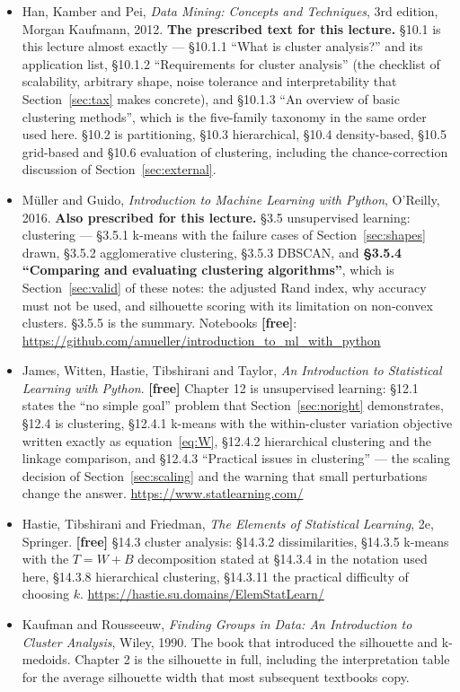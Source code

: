 \documentclass[11pt]{article}
\begin{document}
\begin{itemize}[leftmargin=*]
  \item Han, Kamber and Pei, \emph{Data Mining: Concepts and Techniques}, 3rd
    edition, Morgan Kaufmann, 2012. \textbf{The prescribed text for this
    lecture.} \S10.1 is this lecture almost exactly --- \S10.1.1 ``What is
    cluster analysis?'' and its application list, \S10.1.2 ``Requirements for
    cluster analysis'' (the checklist of scalability, arbitrary shape, noise
    tolerance and interpretability that Section~\ref{sec:tax} makes concrete),
    and \S10.1.3 ``An overview of basic clustering methods'', which is the
    five-family taxonomy in the same order used here. \S10.2 is partitioning,
    \S10.3 hierarchical, \S10.4 density-based, \S10.5 grid-based and \S10.6
    evaluation of clustering, including the chance-correction discussion of
    Section~\ref{sec:external}.
  \item M\"uller and Guido, \emph{Introduction to Machine Learning with
    Python}, O'Reilly, 2016. \textbf{Also prescribed for this lecture.}
    \S3.5 unsupervised learning: clustering --- \S3.5.1 k-means with the
    failure cases of Section~\ref{sec:shapes} drawn, \S3.5.2 agglomerative
    clustering, \S3.5.3 DBSCAN, and \textbf{\S3.5.4 ``Comparing and
    evaluating clustering algorithms''}, which is Section~\ref{sec:valid} of
    these notes: the adjusted Rand index, why accuracy must not be used, and
    silhouette scoring with its limitation on non-convex clusters. \S3.5.5
    is the summary. Notebooks \textbf{[free]}:
    \url{https://github.com/amueller/introduction_to_ml_with_python}
  \item James, Witten, Hastie, Tibshirani and Taylor, \emph{An Introduction to
    Statistical Learning with Python}. \textbf{[free]} Chapter 12 is
    unsupervised learning: \S12.1 states the ``no simple goal'' problem that
    Section~\ref{sec:noright} demonstrates, \S12.4 is clustering, \S12.4.1
    k-means with the within-cluster variation objective written exactly as
    equation~\eqref{eq:W}, \S12.4.2 hierarchical clustering and the linkage
    comparison, and \S12.4.3 ``Practical issues in clustering'' --- the
    scaling decision of Section~\ref{sec:scaling} and the warning that small
    perturbations change the answer. \url{https://www.statlearning.com/}
  \item Hastie, Tibshirani and Friedman, \emph{The Elements of Statistical
    Learning}, 2e, Springer. \textbf{[free]} \S14.3 cluster analysis: \S14.3.2
    dissimilarities, \S14.3.5 k-means with the $T = W + B$ decomposition
    stated at \S14.3.4 in the notation used here, \S14.3.8 hierarchical
    clustering, \S14.3.11 the practical difficulty of choosing $k$.
    \url{https://hastie.su.domains/ElemStatLearn/}
  \item Kaufman and Rousseeuw, \emph{Finding Groups in Data: An Introduction
    to Cluster Analysis}, Wiley, 1990. The book that introduced the silhouette
    and k-medoids. Chapter 2 is the silhouette in full, including the
    interpretation table for the average silhouette width that most
    subsequent textbooks copy.
\end{itemize}
\end{document}
